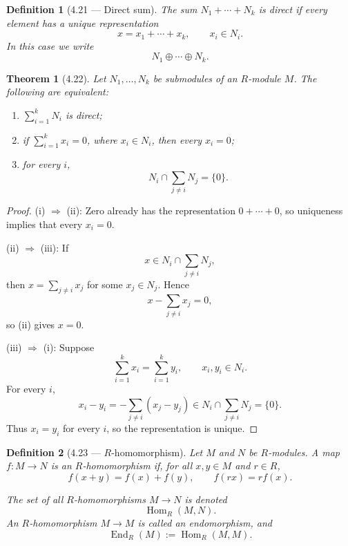 \documentclass[12pt]{article}
\newtheorem{theorem}{Theorem}
\newtheorem{definition}{Definition}
\begin{document}
\begin{definition}[4.21 — Direct sum]

The sum $N_1+\cdots+N_k$ is \emph{direct} if every element has a unique representation
\[
x=x_1+\cdots+x_k,\qquad x_i\in N_i.
\]
In this case we write
\[
N_1\oplus\cdots\oplus N_k.
\]

\end{definition}

\begin{theorem}[4.22]

Let $N_1,\ldots,N_k$ be submodules of an $R$-module $M$. The following are equivalent:

\begin{enumerate}[label=(\roman*)]

  \item $\sum_{i=1}^k N_i$ is direct;

  \item if $\sum_{i=1}^k x_i=0$, where $x_i\in N_i$, then every $x_i=0$;

  \item for every $i$,
  \[
  N_i\cap\sum_{j\neq i}N_j=\{0\}.
  \]

\end{enumerate}

\end{theorem}

\begin{proof}

(i) $\Rightarrow$ (ii): Zero already has the representation $0+\cdots+0$, so uniqueness implies that every $x_i=0$.

(ii) $\Rightarrow$ (iii): If
\[
x\in N_i\cap\sum_{j\neq i}N_j,
\]
then $x=\sum_{j\neq i}x_j$ for some $x_j\in N_j$. Hence
\[
x-\sum_{j\neq i}x_j=0,
\]
so (ii) gives $x=0$.

(iii) $\Rightarrow$ (i): Suppose
\[
\sum_{i=1}^k x_i=\sum_{i=1}^k y_i,
\qquad x_i,y_i\in N_i.
\]
For every $i$,
\[
x_i-y_i=-\sum_{j\neq i}(x_j-y_j)
\in N_i\cap\sum_{j\neq i}N_j=\{0\}.
\]
Thus $x_i=y_i$ for every $i$, so the representation is unique.

\end{proof}

\begin{definition}[4.23 — $R$-homomorphism]

Let $M$ and $N$ be $R$-modules. A map $f\colon M\to N$ is an \emph{$R$-homomorphism} if, for all $x,y\in M$ and $r\in R$,
\[
f(x+y)=f(x)+f(y),
\qquad
f(rx)=rf(x).
\]

The set of all $R$-homomorphisms $M\to N$ is denoted
\[
\operatorname{Hom}_R(M,N).
\]
An $R$-homomorphism $M\to M$ is called an \emph{endomorphism}, and
\[
\operatorname{End}_R(M):=\operatorname{Hom}_R(M,M).
\]

\end{definition}
\end{document}
